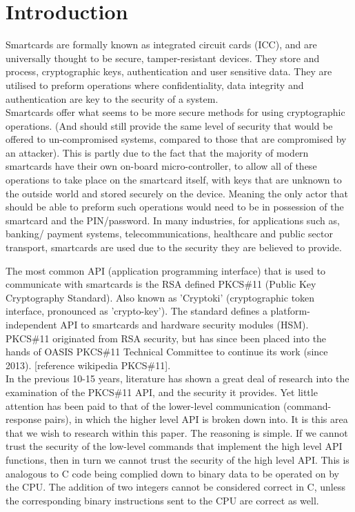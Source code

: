 \documentclass[bsc,frontabs,twoside,singlespacing,parskip,deptreport]{infthesis}     %
\begin{document}

\chapter{Introduction}
Smartcards are formally known as integrated circuit cards (ICC), and are universally thought to be secure, tamper-resistant devices. They store and process, cryptographic keys, authentication and user sensitive data. They are utilised to preform operations where confidentiality, data integrity and authentication are key to the security of a system.\\

Smartcards offer what seems to be more secure methods for using cryptographic operations. (And should still provide the same level of security that would be offered to un-compromised systems, compared to those that are compromised by an attacker). This is partly due to the fact that the majority of modern smartcards have their own on-board micro-controller, to allow all of these operations to take place on the smartcard itself, with keys that are unknown to the outside world and stored securely on the device. Meaning the only actor that should be able to preform such operations would need to be in possession of the smartcard and the PIN/password. In many industries, for applications such as, banking/ payment systems, telecommunications, healthcare and public sector transport, smartcards are used due to the security they are believed to provide.

The most common API (application programming interface) that is used to communicate with smartcards is the RSA defined PKCS\#11 (Public Key Cryptography Standard). Also known as 'Cryptoki' (cryptographic token interface, pronounced as 'crypto-key'). The standard defines a platform-independent API to smartcards and hardware security modules (HSM). PKCS\#11 originated from RSA security, but has since been placed into the hands of OASIS PKCS\#11 Technical Committee to continue its work (since 2013). [reference wikipedia PKCS\#11].\\


In the previous 10-15 years, literature has shown a great deal of research into the examination of the PKCS\#11 API, and the security it provides. Yet little attention has been paid to that of the lower-level communication (command-response pairs), in which the higher level API is broken down into. It is this area that we wish to research within this paper. The reasoning is simple. If we cannot trust the security of the low-level commands that implement the high level API functions, then in turn we cannot trust the security of the high level API. This is analogous to C code being complied down to binary data to be operated on by the CPU. The addition of two integers cannot be considered correct in C, unless the corresponding binary instructions sent to the CPU are correct as well.  
\end{document}
